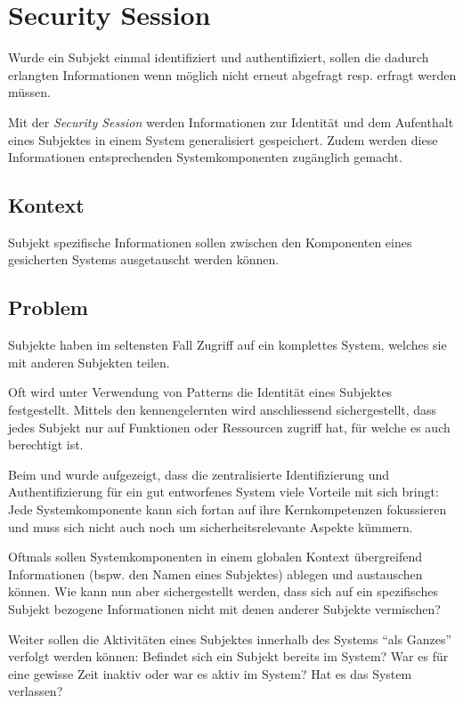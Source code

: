 \section{Security Session}
\label{sec:security-session}
Wurde ein Subjekt einmal identifiziert und authentifiziert, sollen die dadurch erlangten Informationen wenn möglich nicht erneut abgefragt resp. erfragt werden müssen.

Mit der \emph{Security Session} werden Informationen zur Identität und dem Aufenthalt eines Subjektes in einem System generalisiert gespeichert. Zudem werden diese Informationen entsprechenden Systemkomponenten zugänglich gemacht.

\subsection*{Kontext}
Subjekt spezifische Informationen sollen zwischen den Komponenten eines gesicherten Systems ausgetauscht werden können.

\subsection*{Problem}
Subjekte haben im seltensten Fall Zugriff auf ein komplettes System, welches sie mit anderen Subjekten teilen.

Oft wird unter Verwendung von \emph{} Patterns die Identität eines Subjektes festgestellt. Mittels den kennengelernten \emph{} wird anschliessend sichergestellt, dass jedes Subjekt nur auf Funktionen oder Ressourcen zugriff hat, für welche es auch berechtigt ist.

Beim \emph{} und \emph{} wurde aufgezeigt, dass die zentralisierte Identifizierung und Authentifizierung für ein gut entworfenes System viele Vorteile mit sich bringt: Jede Systemkomponente kann sich fortan auf ihre Kernkompetenzen fokussieren und muss sich nicht auch noch um sicherheitsrelevante Aspekte kümmern.

Oftmals sollen Systemkomponenten in einem globalen Kontext übergreifend Informationen (bspw. den Namen eines Subjektes) ablegen und austauschen können. Wie kann nun aber sichergestellt werden, dass sich auf ein spezifisches Subjekt bezogene Informationen nicht mit denen anderer Subjekte vermischen?

Weiter sollen die Aktivitäten eines Subjektes innerhalb des Systems ``als Ganzes'' verfolgt werden können: Befindet sich ein Subjekt bereits im System? War es für eine gewisse Zeit inaktiv oder war es aktiv im System? Hat es das System verlassen?


